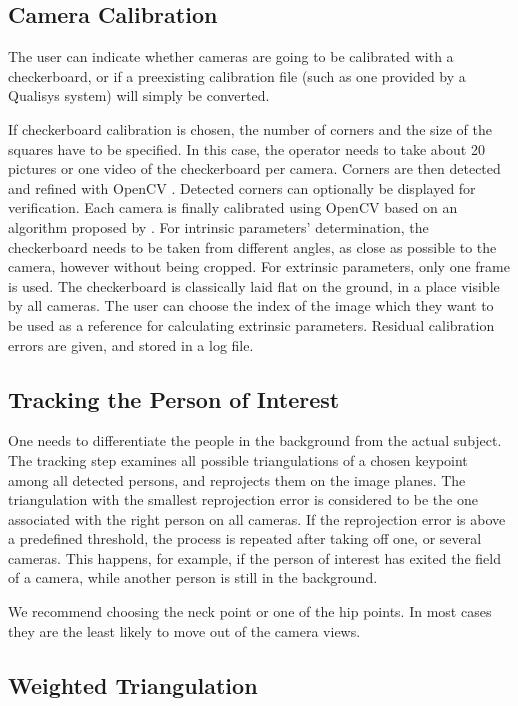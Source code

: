 \subsection{Camera Calibration}

The user can indicate whether cameras are going to be calibrated with a checkerboard, or if a preexisting calibration file (such as one provided by a Qualisys system) will simply be converted.

If checkerboard calibration is chosen, the number of corners and the size of the squares have to be specified. In this case, the operator needs to take about 20 pictures or one video of the checkerboard per camera. Corners are then detected and refined with OpenCV \cite{Bradski2000}. Detected corners can optionally be displayed for verification. Each camera is finally calibrated using OpenCV based on an algorithm proposed by \cite{Zhang2000}. For intrinsic parameters' determination, the checkerboard needs to be taken from different angles, as close as possible to the camera, however without being cropped. For extrinsic parameters, only one frame is used. The checkerboard is classically laid flat on the ground, in a place visible by all cameras. The user can choose the index of the image which they want to be used as a reference for calculating extrinsic parameters. Residual calibration errors are given, and stored in a log file.


\subsection{Tracking the Person of Interest}\label{tracking}

One needs to differentiate the people in the background from the actual subject. The tracking step examines all possible triangulations of a chosen keypoint among all detected persons, and reprojects them on the image planes. The triangulation with the smallest reprojection error is considered to be the one associated with the right person on all cameras. If the reprojection error is above a predefined threshold, the process is repeated after taking off one, or several cameras. This happens, for example, if the person of interest has exited the field of a camera, while another person is still in the background.

We recommend choosing the neck point or one of the hip points. In most cases they are the least likely to move out of the camera views.


\subsection{Weighted Triangulation}


